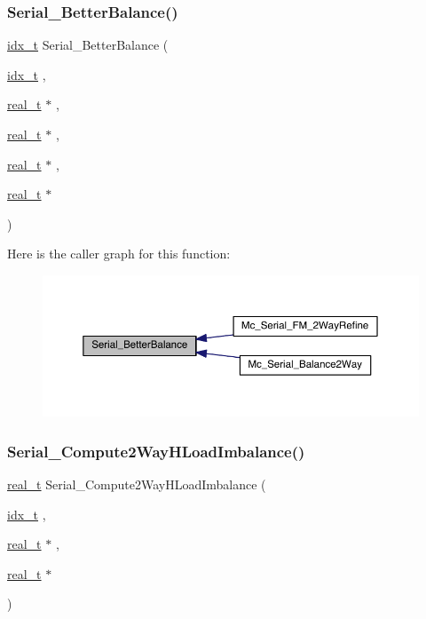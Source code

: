 \subsubsection{\texorpdfstring{Serial\+\_\+\+Better\+Balance()}{Serial\_BetterBalance()}}
{\footnotesize\ttfamily \hyperlink{a00876_aaa5262be3e700770163401acb0150f52}{idx\+\_\+t} Serial\+\_\+\+Better\+Balance (\begin{DoxyParamCaption}\item[{\hyperlink{a00876_aaa5262be3e700770163401acb0150f52}{idx\+\_\+t}}]{,  }\item[{\hyperlink{a00876_a1924a4f6907cc3833213aba1f07fcbe9}{real\+\_\+t} $\ast$}]{,  }\item[{\hyperlink{a00876_a1924a4f6907cc3833213aba1f07fcbe9}{real\+\_\+t} $\ast$}]{,  }\item[{\hyperlink{a00876_a1924a4f6907cc3833213aba1f07fcbe9}{real\+\_\+t} $\ast$}]{,  }\item[{\hyperlink{a00876_a1924a4f6907cc3833213aba1f07fcbe9}{real\+\_\+t} $\ast$}]{ }\end{DoxyParamCaption})}

Here is the caller graph for this function\+:\nopagebreak
\begin{figure}[H]
\begin{center}
\leavevmode
\includegraphics[width=350pt]{a00951_ad43c6f51949b18b169f0597fc1362f74_icgraph}
\end{center}
\end{figure}
\mbox{\label{a00951_a9d86e1452d22862f6c41fd07390cea54}} 
\subsubsection{\texorpdfstring{Serial\+\_\+\+Compute2\+Way\+H\+Load\+Imbalance()}{Serial\_Compute2WayHLoadImbalance()}}
{\footnotesize\ttfamily \hyperlink{a00876_a1924a4f6907cc3833213aba1f07fcbe9}{real\+\_\+t} Serial\+\_\+\+Compute2\+Way\+H\+Load\+Imbalance (\begin{DoxyParamCaption}\item[{\hyperlink{a00876_aaa5262be3e700770163401acb0150f52}{idx\+\_\+t}}]{,  }\item[{\hyperlink{a00876_a1924a4f6907cc3833213aba1f07fcbe9}{real\+\_\+t} $\ast$}]{,  }\item[{\hyperlink{a00876_a1924a4f6907cc3833213aba1f07fcbe9}{real\+\_\+t} $\ast$}]{ }\end{DoxyParamCaption})}

